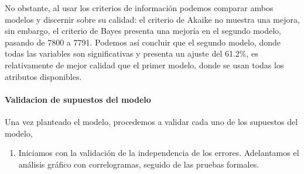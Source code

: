 \documentclass[11pt]{article}
\providecommand{\tightlist}{%
      \setlength{\itemsep}{0pt}\setlength{\parskip}{0pt}}
\begin{document}
No obstante, al usar los criterios de información podemos comparar ambos
modelos y discernir sobre su calidad: el criterio de Akaike no muestra
una mejora, sin embargo, el criterio de Bayes presenta una mejoría en el
segundo modelo, pasando de 7800 a 7791. Podemos así concluir que el
segundo modelo, donde todas las variables son significativas y presenta
un ajuste del 61.2\%, es relativamente de mejor calidad que el primer
modelo, donde se usan todas los atributos disponibles.

    \hypertarget{validacion-de-supuestos-del-modelo}{%
\paragraph{Validacion de supuestos del
modelo}\label{validacion-de-supuestos-del-modelo}}

Una vez planteado el modelo, procedemos a validar cada uno de los
supuestos del modelo,

\begin{enumerate}
\def\labelenumi{\arabic{enumi}.}
\tightlist
\item
  Iniciamos con la validación de la independencia de los errores.
  Adelantamos el análisis gráfico con correlogramas, seguido de las
  pruebas formales.
\end{enumerate}
\end{document}
